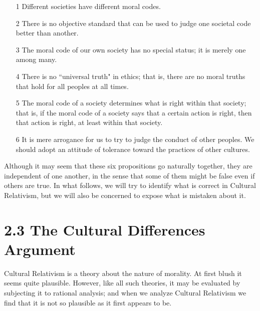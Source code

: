 \begin{enumerate}
\item[1] Different societies have different moral codes.
\item[2] There  is  no  objective  standard  that  can  be  used  to  judge 
one societal code better than another.
\item[3] The moral code of our own society has no special status; it 
is merely one among many. 
\item[4] There  is no ``universal truth"  in ethics; that  is, there are no 
moral truths that hold for all peoples at all times. 
\item[5] The moral code of a society determines what is right within 
that society; that is, if the moral code of a society says that 
a  certain  action  is  right,  then  that  action  is  right,  at  least 
within that society. 
\item[6] It  is  mere  arrogance  for  us  to  try  to  judge  the  conduct  of 
other  peoples.  We  should  adopt  an  attitude  of  tolerance 
toward the practices of other cultures.
\end{enumerate}

Although  it  may  seem  that  these  six  propositions  go  naturally  together, 
they  are  independent  of  one  another,  in  the  sense  that  some  of  them 
might  be  false  even  if  others  are  true.  In  what  follows,  we  will  try  to 
identify what  is  correct in Cultural Relativism, but  we will  also be 
concerned to expose what is mistaken about it.

\section{2.3 The Cultural Differences Argument} 
Cultural Relativism is a theory about the nature of morality. At first blush 
it  seems  quite  plausible.  However,  like  all  such  theories,  it  may  be 
evaluated  by  subjecting  it  to  rational  analysis;  and  when  we  analyze 
Cultural Relativism we find that it is not so plausible as it first appears to 
be. 

